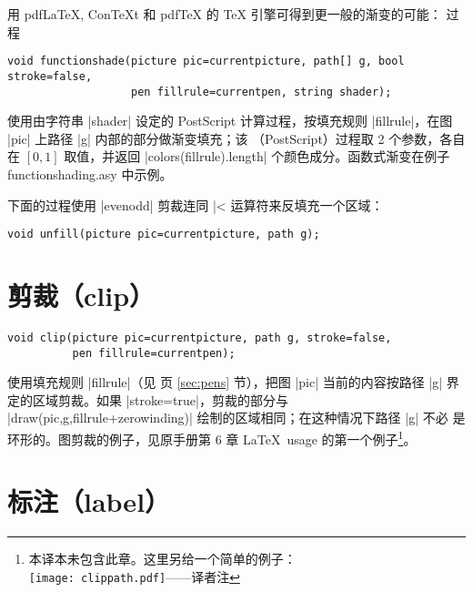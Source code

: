 \documentclass[nofonts,CJKnormalspaces]{ctexbook}[2009/05/20]
\newcommand*\ConTeXt{Con\TeX{}t}
\newcommand*\prgname[1]{\textsf{#1}}
\newcommand\transnote[1]{\footnote{#1——译者注}}
\begin{document}
用 pdf\LaTeX, \ConTeXt{} 和 pdf\TeX{} 的 \TeX{} 引擎可得到更一般的渐变的可能：
过程
\begin{lstlisting}
void functionshade(picture pic=currentpicture, path[] g, bool stroke=false,
                   pen fillrule=currentpen, string shader);
\end{lstlisting}
使用由字符串 |shader| 设定的 \prgname{PostScript} 计算过程，按填充规则
|fillrule|，在图 |pic| 上路径 |g| 内部的部分做渐变填充；该
（\prgname{PostScript}）过程取 2 个参数，各自在 $[0,1]$ 取值，并返回
|colors(fillrule).length| 个颜色成分。函数式渐变在例子
\prgname{functionshading.asy} 中示例。

下面的过程使用 |evenodd| 剪裁连同 |^^| 运算符来反填充一个区域：
\begin{lstlisting}
void unfill(picture pic=currentpicture, path g);
\end{lstlisting}


\section{剪裁（clip）}

\begin{lstlisting}
void clip(picture pic=currentpicture, path g, stroke=false,
          pen fillrule=currentpen);
\end{lstlisting}
使用填充规则 |fillrule|（见 \pageref{sec:pens} 页 \ref{sec:pens} 节），把图
|pic| 当前的内容按路径 |g| 界定的区域剪裁。如果 |stroke=true|，剪裁的部分与
|draw(pic,g,fillrule+zerowinding)| 绘制的区域相同；在这种情况下路径 |g| 不必
是环形的。图剪裁的例子，见原手册第 6 章 \LaTeX\ usage 的第一个例子\transnote{
本译本未包含此章。这里另给一个简单的例子：\\
\vbox{}%
\texttt{[image: clippath.pdf]}\box0}。


\section{标注（label）}
\label{sec:label}
\end{document}
